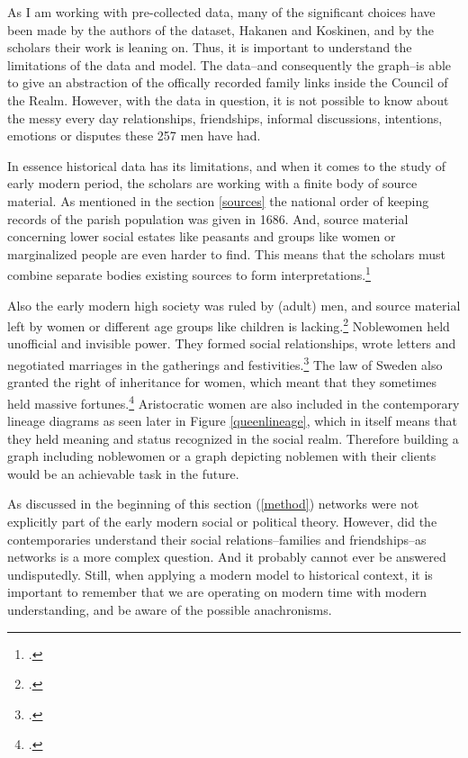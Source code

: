 As I am working with pre-collected data, many of the significant choices have been made by the authors of the dataset, Hakanen and Koskinen, and by the scholars their work is leaning on. Thus, it is important to understand the limitations of the data and model. The data–and consequently the graph–is able to give an abstraction of the offically recorded family links inside the Council of the Realm. However, with the data in question, it is not possible to know about the messy every day relationships, friendships, informal discussions, intentions, emotions or disputes these 257 men have had. 

In essence historical data has its limitations, and when it comes to the study of early modern period, the scholars are working with a finite body of source material. As mentioned in the section \ref{sources} the national order of keeping records of the parish population was given in 1686. And, source material concerning lower social estates like peasants and groups like women or marginalized people are even harder to find. This means that the scholars must combine separate bodies existing sources to form interpretations.\footcite[p. 218.]{FagerlundA1999}

Also the early modern high society was ruled by (adult) men, and source material left by women or different age groups like children is lacking.\footcites[p. 158]{lappalainen06}[pp. 40-41.]{lappalainen06} Noblewomen held unofficial and invisible power. They formed social relationships, wrote letters and negotiated marriages in the gatherings and festivities.\footcites[pp. 140-142]{hakanenEtAll2020}[pp. 40-41.]{lappalainen06} The law of Sweden also granted the right of inheritance for women, which meant that they sometimes held massive fortunes.\footcites[p. 43]{lahtinen2020}[p. 40.]{lappalainen06} Aristocratic women are also included in the contemporary lineage diagrams as seen later in Figure \ref{queenlineage}, which in itself means that they held meaning and status recognized in the social realm. Therefore building a graph including noblewomen or a graph depicting noblemen with their clients would be an achievable task in the future.

As discussed in the beginning of this section (\ref{method}) networks were not explicitly part of the early modern social or political theory. However, did the contemporaries understand their social relations–families and friendships–as networks is a more complex question. And it probably cannot ever be answered undisputedly. Still, when applying a modern model to historical context, it is important to remember that we are operating on modern time with modern understanding, and be aware of the possible anachronisms.

